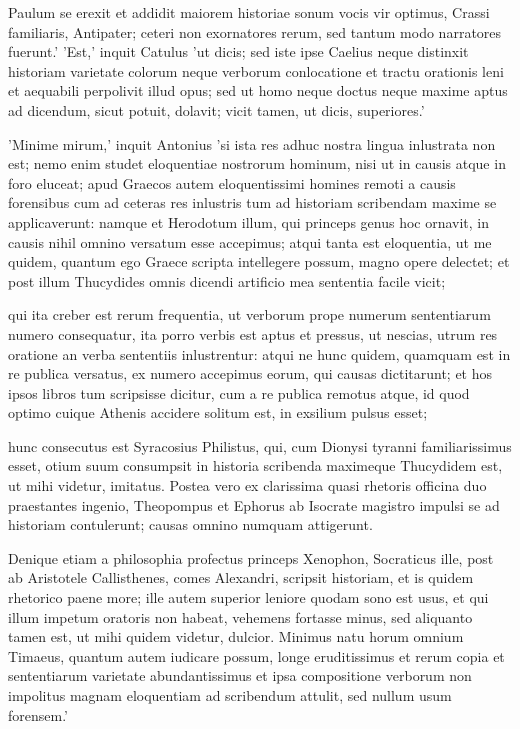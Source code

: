  Paulum se erexit et addidit maiorem historiae sonum vocis vir optimus, Crassi familiaris, Antipater; ceteri non exornatores rerum, sed tantum modo narratores fuerunt.' 'Est,' inquit Catulus 'ut dicis; sed iste ipse Caelius neque distinxit historiam varietate colorum neque verborum conlocatione et tractu orationis leni et aequabili perpolivit illud opus; sed ut homo neque doctus neque maxime aptus ad dicendum, sicut potuit, dolavit; vicit tamen, ut dicis, superiores.'

 'Minime mirum,' inquit Antonius 'si ista res adhuc nostra lingua inlustrata non est; nemo enim studet eloquentiae nostrorum hominum, nisi ut in causis atque in foro eluceat; apud Graecos autem eloquentissimi homines remoti a causis forensibus cum ad ceteras res inlustris tum ad historiam scribendam maxime se applicaverunt: namque et Herodotum illum, qui princeps genus hoc ornavit, in causis nihil omnino versatum esse accepimus; atqui tanta est eloquentia, ut me quidem, quantum ego Graece scripta intellegere possum, magno opere delectet; et post illum Thucydides omnis dicendi artificio mea sententia facile vicit;

 qui ita creber est rerum frequentia, ut verborum prope numerum sententiarum numero consequatur, ita porro verbis est aptus et pressus, ut nescias, utrum res oratione an verba sententiis inlustrentur: atqui ne hunc quidem, quamquam est in re publica versatus, ex numero accepimus eorum, qui causas dictitarunt; et hos ipsos libros tum scripsisse dicitur, cum a re publica remotus atque, id quod optimo cuique Athenis accidere solitum est, in exsilium pulsus esset;

 hunc consecutus est Syracosius Philistus, qui, cum Dionysi tyranni familiarissimus esset, otium suum consumpsit in historia scribenda maximeque Thucydidem est, ut mihi videtur, imitatus. Postea vero ex clarissima quasi rhetoris officina duo praestantes ingenio, Theopompus et Ephorus ab Isocrate magistro impulsi se ad historiam contulerunt; causas omnino numquam attigerunt.

 Denique etiam a philosophia profectus princeps Xenophon, Socraticus ille, post ab Aristotele Callisthenes, comes Alexandri, scripsit historiam, et is quidem rhetorico paene more; ille autem superior leniore quodam sono est usus, et qui illum impetum oratoris non habeat, vehemens fortasse minus, sed aliquanto tamen est, ut mihi quidem videtur, dulcior. Minimus natu horum omnium Timaeus, quantum autem iudicare possum, longe eruditissimus et rerum copia et sententiarum varietate abundantissimus et ipsa compositione verborum non impolitus magnam eloquentiam ad scribendum attulit, sed nullum usum forensem.'

